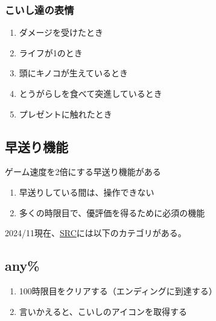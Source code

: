 \subsubsection{こいし達の表情}
\begin{enumerate}[label={\sarrow}]
\item ダメージを受けたとき
\item ライフが1のとき
\item 頭にキノコが生えているとき
\item とうがらしを食べて突進しているとき
\item プレゼントに触れたとき
\end{enumerate}


\subsection{早送り機能}
ゲーム速度を2倍にする早送り機能がある
\begin{enumerate}[label={\sarrow}]
\item 早送りしている間は、操作できない
\item 多くの時限目で、優評価を得るために必須の機能
\end{enumerate}







2024/11現在、\href{https://www.speedrun.com/komeiji_satori_no_jousou_kyouiku}{SRC}には以下のカテゴリがある。


\subsection{any\%}
\begin{enumerate}[label={\sarrow}]
\item 100時限目をクリアする（エンディングに到達する）
\item 言いかえると、こいしのアイコンを取得する
\end{enumerate}


